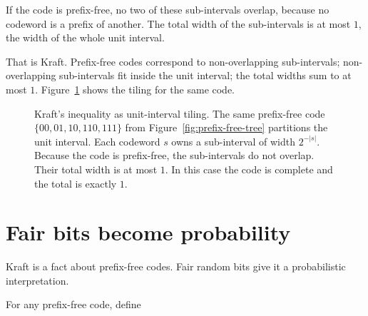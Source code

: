 If the code is prefix-free, no two of these sub-intervals overlap, because no codeword is a prefix of another. The total width of the sub-intervals is at most $1$, the width of the whole unit interval.

That is Kraft. Prefix-free codes correspond to non-overlapping sub-intervals; non-overlapping sub-intervals fit inside the unit interval; the total widths sum to at most $1$. Figure~\ref{fig:kraft-interval} shows the tiling for the same code.

\begin{figure}[h]
\centering
{}
\caption{Kraft's inequality as unit-interval tiling. The same prefix-free code $\{00, 01, 10, 110, 111\}$ from Figure~\ref{fig:prefix-free-tree} partitions the unit interval. Each codeword $s$ owns a sub-interval of width $2^{-|s|}$. Because the code is prefix-free, the sub-intervals do not overlap. Their total width is at most $1$. In this case the code is complete and the total is exactly $1$.}
\label{fig:kraft-interval}
\end{figure}

\section*{Fair bits become probability}

Kraft is a fact about prefix-free codes. Fair random bits give it a probabilistic interpretation.

For any prefix-free code, define

